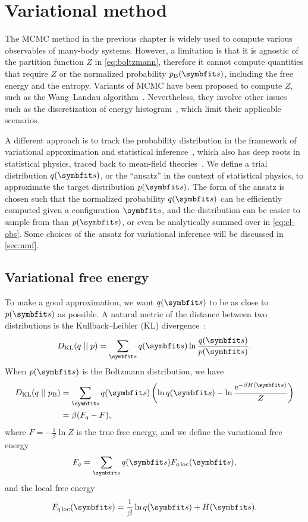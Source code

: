 \chapter{Variational method}

The MCMC method in the previous chapter is widely used to compute various observables of many-body systems. However, a limitation is that it is agnostic of the partition function $Z$ in \cref{eq:boltzmann}, therefore it cannot compute quantities that require $Z$ or the normalized probability $p_\text{B}(\vs)$, including the free energy and the entropy. Variants of MCMC have been proposed to compute $Z$, such as the Wang--Landau algorithm~\cite{wang2001efficient, landau2021guide5}. Nevertheless, they involve other issues such as the discretization of energy histogram~\cite{belardinelli2007wang}, which limit their applicable scenarios.

A different approach is to track the probability distribution in the framework of variational approximation and statistical inference~\cite{jordan1999introduction, mackay2003information}, which also has deep roots in statistical physics, traced back to mean-field theories~\cite{chaikin1995principles4, zdeborova2016statistical}. We define a trial distribution $q(\vs)$, or the ``ansatz'' in the context of statistical physics, to approximate the target distribution $p(\vs)$. The form of the ansatz is chosen such that the normalized probability $q(\vs)$ can be efficiently computed given a configuration $\vs$, and the distribution can be easier to sample from than $p(\vs)$, or even be analytically summed over in \cref{eq:cl-obs}. Some choices of the ansatz for variational inference will be discussed in \cref{sec:nmf}.

\section{Variational free energy}

To make a good approximation, we want $q(\vs)$ to be as close to $p(\vs)$ as possible. A natural metric of the distance between two distributions is the Kullback--Leibler (KL) divergence~\cite{kullback1951information}:
\begin{equation}
D_\text{KL}(q \mid\mid p) = \sum_\vs q(\vs) \ln \frac{q(\vs)}{p(\vs)}.
\end{equation}
When $p(\vs)$ is the Boltzmann distribution, we have
\begin{align}
D_\text{KL}(q \mid\mid p_\text{B}) &= \sum_\vs q(\vs) \left( \ln q(\vs) - \ln \frac{\rme^{-\beta H(\vs)}}{Z} \right) \\
&= \beta (F_q - F),
\label{eq:kl-fq}
\end{align}
where $F = -\frac{1}{\beta} \ln Z$ is the true free energy, and we define the variational free energy
\begin{equation}
F_q = \sum_\vs q(\vs) F_{q\,\text{loc}}(\vs),
\label{eq:fq}
\end{equation}
and the local free energy
\begin{equation}
F_{q\,\text{loc}}(\vs) = \frac{1}{\beta} \ln q(\vs) + H(\vs).
\label{eq:fq-loc}
\end{equation}

